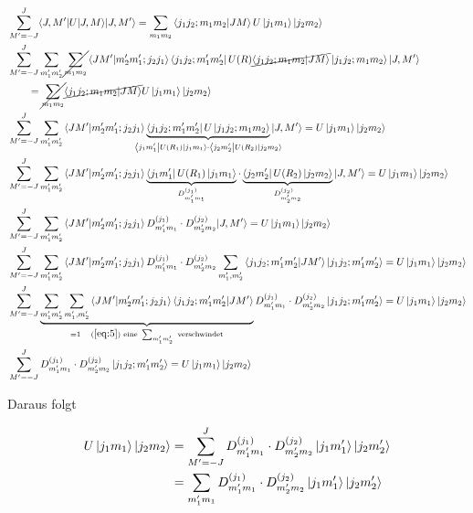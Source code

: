 \begin{align}
  \label{eq:22}
  &\sum_{M'=-J}^J \langle J,M'|  U|J,M\rangle |J,M'\rangle = \sum_{m_1 m_2} \braket{j_1j_2;m_1m_2}{JM}U\ket{j_1m_1}\ket{j_2m_2}\notag \\
&\sum_{M'=-J}^J \sum_{m'_1m'_2}\cancel{\sum_{m_1m_2}}\braket{JM'}{m'_2m'_1;j_2j_1}\bra{j_1j_2;m'_1m'_2}  U(R) \cancel{\braket{j_1j_2;m_1m_2}{JM}}\ket{j_1j_2;m_1m_2}  |J,M'\rangle\notag \\
& \qquad = \cancel{\sum_{m_1 m_2}}\cancel{\braket{j_1j_2;m_1m_2}{JM}}U\ket{j_1m_1}\ket{j_2m_2}\notag \\
&\sum_{M'=-J}^J \sum_{m'_1m'_2}\braket{JM'}{m'_2m'_1;j_2j_1} \underbr{ \bra{j_1j_2;m'_1m'_2}  U \ket{j_1j_2;m_1m_2} }_{  \bra{j_1m'_1}  U(R_1) \ket{j_1m_1} \cdot  \bra{j_2m'_2}  U(R_2) \ket{j_2m_2}  } |J,M'\rangle  = U\ket{j_1m_1}\ket{j_2m_2} \notag\\
&\sum_{M'=-J}^J \sum_{m'_1m'_2}\braket{JM'}{m'_2m'_1;j_2j_1} \underbr{ \bra{j_1m'_1}  U(R_1) \ket{j_1m_1}}_{D^{(j_1)}_{m'_1m_1}} \cdot \underbr{\bra{j_2m'_2}  U(R_2) \ket{j_2m_2} }_{D^{(j_2)}_{m'_2m_2} }  |J,M'\rangle  = U\ket{j_1m_1}\ket{j_2m_2}\notag \\
&\sum_{M'=-J}^J \sum_{m'_1m'_2}\braket{JM'}{m'_2m'_1;j_2j_1} D^{(j_1)}_{m'_1m_1} \cdot D^{(j_2)}_{m'_2m_2}   |J,M'\rangle  = U\ket{j_1m_1}\ket{j_2m_2}\notag \\
&\sum_{M'=-J}^J \sum_{m'_1m'_2}\braket{JM'}{m'_2m'_1;j_2j_1} D^{(j_1)}_{m'_1m_1} \cdot D^{(j_2)}_{m'_2m_2}  \sum_{m'_1,m'_2}\braket{j_1j_2;m'_1m'_2}{JM'}\ket{j_1j_2;m'_1m'_2}  = U\ket{j_1m_1}\ket{j_2m_2}\notag \\
&\sum_{M'=-J}^J \underbr{\sum_{m'_1m'_2} \sum_{m'_1,m'_2} \braket{JM'}{m'_2m'_1;j_2j_1}\braket{j_1j_2;m'_1m'_2}{JM'}}_{=1 \quad(\ref{eq:5}) \text{ eine }\sum_{m'_1m'_2}\text{ verschwindet} } D^{(j_1)}_{m'_1m_1} \cdot D^{(j_2)}_{m'_2m_2} \ket{j_1j_2;m'_1m'_2}  = U\ket{j_1m_1}\ket{j_2m_2}\notag \\
&\sum_{M'=-J}^J  D^{(j_1)}_{m'_1m_1} \cdot D^{(j_2)}_{m'_2m_2} \ket{j_1j_2;m'_1m'_2}  = U\ket{j_1m_1}\ket{j_2m_2}
\end{align}


Daraus folgt

\begin{align}
  \label{eq:23}
   U\left| j_1m_1 \right\rangle\left| j_2m_2 \right\rangle &= \sum_{M'=-J}^J  D^{(j_1)}_{m'_1m_1} \cdot D^{(j_2)}_{m'_2m_2} \left| j_1m'_1 \right\rangle\left| j_2m'_2 \right\rangle \\
&= \sum_{m'_1m_1}  D^{(j_1)}_{m'_1m_1} \cdot D^{(j_2)}_{m'_2m_2} \left| j_1m'_1 \right\rangle\left| j_2m'_2 \right\rangle \\
\end{align}



